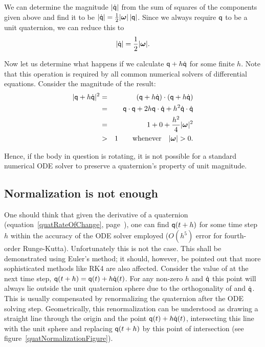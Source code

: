 We can determine the magnitude $|\dot{\mathsf{q}}|$ from the sum of squares of the
components given above and find it to be
$\norm{\dot{\q{q}}} = \frac{1}{2}\norm{\ve{\omega}}\,\norm{\q{q}}$. Since we always
require $\mathsf{q}$ to be a unit quaternion, we can reduce this to
\begin{equation}
\label{quatRateOfChangeMagnitude}
\norm{\dot{\q{q}}} = \frac{1}{2}\norm{\ve{\omega}}.
\end{equation}

Now let us determine what happens if we calculate $\mathsf{q} + h\dot{\mathsf{q}}$ for some finite $h$.
Note that this operation is required by all common numerical solvers of differential equations.
Consider the magnitude of the result:
\begin{eqnarray*}
\norm{\q{q} + h\dot{\q{q}}}^2 & = & (\q{q} + h\dot{\q{q}})\cdot(\q{q} + h\dot{\q{q}}) \\
&=& \q{q}\cdot\q{q} + 2h\q{q}\cdot\dot{\q{q}} + h^2\dot{\q{q}}\cdot\dot{\q{q}} \\
&=& 1 + 0 + \frac{h^2}{4}\norm{\ve{\omega}}^2 \\
&>& 1 \quad\quad\mbox{whenever}\quad \norm{\ve{\omega}} > 0.
\end{eqnarray*}

Hence, if the body in question is rotating, it is not possible for a standard numerical ODE solver
to preserve a quaternion's property of unit magnitude.


\subsection{Normalization is not enough\label{quatNormalization}}

One should think that given the derivative of a quaternion  (equation~\ref{quatRateOfChange},
page~\pageref{quatRateOfChange}), one can find $\mathsf{q}(t + h)$ for some time step $h$ within
the accuracy of the ODE solver employed ($O(h^5)$ error for fourth-order Runge-Kutta).
Unfortunately this is not the case. This shall be demonstrated using Euler's method; it should,
however, be pointed out that more sophisticated methods like RK4 are also affected. Consider the
value of  at the next time step, $\mathsf{q}(t + h) = \mathsf{q}(t) + h \dot{\mathsf{q}}(t)$. For any
non-zero $h$ and $\dot{\mathsf{q}}$ this point will always lie outside the unit quaternion sphere due
to the orthogonality of  and $\dot{\mathsf{q}}$. This is usually compensated by renormalizing
the quaternion after the ODE solving step. Geometrically, this renormalization can be understood
as drawing a straight line through the origin and the point $\mathsf{q}(t) + h \dot{\mathsf{q}}(t)$,
intersecting this line with the unit sphere and replacing $\mathsf{q}(t + h)$ by this point of
intersection (see figure~\ref{quatNormalizationFigure}).

